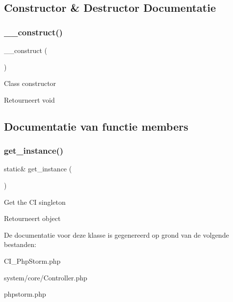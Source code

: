 \subsection{Constructor \& Destructor Documentatie}
\mbox{\label{class_c_i___controller_a095c5d389db211932136b53f25f39685}} 
\subsubsection{\texorpdfstring{\_\_construct()}{\_\_construct()}}
{\footnotesize\ttfamily \+\_\+\+\_\+construct (\begin{DoxyParamCaption}{ }\end{DoxyParamCaption})}

Class constructor

\begin{DoxyReturn}{Retourneert}
void 
\end{DoxyReturn}


\subsection{Documentatie van functie members}
\mbox{\label{class_c_i___controller_a8d3cc57e7b6ec94e704712b0f277f5bb}} 
\subsubsection{\texorpdfstring{get\_instance()}{get\_instance()}}
{\footnotesize\ttfamily static\& get\+\_\+instance (\begin{DoxyParamCaption}{ }\end{DoxyParamCaption})\hspace{0.3cm}{\ttfamily [static]}}

Get the CI singleton

\begin{DoxyReturn}{Retourneert}
object 
\end{DoxyReturn}


De documentatie voor deze klasse is gegenereerd op grond van de volgende bestanden\+:\begin{DoxyCompactItemize}
\item 
C\+I\+\_\+\+Php\+Storm.\+php\item 
system/core/Controller.\+php\item 
phpstorm.\+php\end{DoxyCompactItemize}
